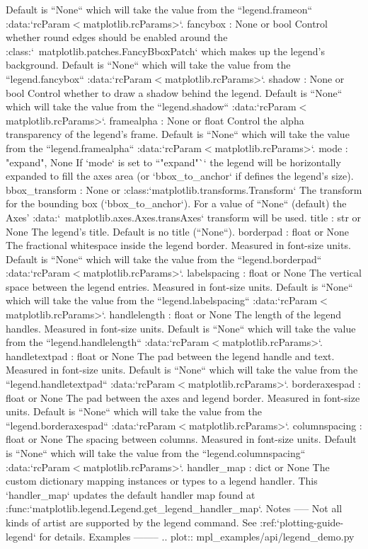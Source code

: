 \begin{description}
Default is ``None`` which will take the value from the ``legend.frameon`` :data:`rcParam$<$matplotlib.rcParams>`. fancybox : None or bool Control whether round edges should be enabled around the :class:`~matplotlib.patches.FancyBboxPatch` which makes up the legend's background. Default is ``None`` which will take the value from the ``legend.fancybox`` :data:`rcParam$<$matplotlib.rcParams>`. shadow : None or bool Control whether to draw a shadow behind the legend. Default is ``None`` which will take the value from the ``legend.shadow`` :data:`rcParam$<$matplotlib.rcParams>`. framealpha : None or float Control the alpha transparency of the legend's frame. Default is ``None`` which will take the value from the ``legend.framealpha`` :data:`rcParam$<$matplotlib.rcParams>`. mode : {"expand", None} If `mode` is set to ``"expand"`` the legend will be horizontally expanded to fill the axes area (or `bbox\_to\_anchor` if defines the legend's size). bbox\_transform : None or :class:`matplotlib.transforms.Transform` The transform for the bounding box (`bbox\_to\_anchor`). For a value of ``None`` (default) the Axes' :data:`~matplotlib.axes.Axes.transAxes` transform will be used. title : str or None The legend's title. Default is no title (``None``). borderpad : float or None The fractional whitespace inside the legend border. Measured in font-size units. Default is ``None`` which will take the value from the ``legend.borderpad`` :data:`rcParam$<$matplotlib.rcParams>`. labelspacing : float or None The vertical space between the legend entries. Measured in font-size units. Default is ``None`` which will take the value from the ``legend.labelspacing`` :data:`rcParam$<$matplotlib.rcParams>`. handlelength : float or None The length of the legend handles. Measured in font-size units. Default is ``None`` which will take the value from the ``legend.handlelength`` :data:`rcParam$<$matplotlib.rcParams>`. handletextpad : float or None The pad between the legend handle and text. Measured in font-size units. Default is ``None`` which will take the value from the ``legend.handletextpad`` :data:`rcParam$<$matplotlib.rcParams>`. borderaxespad : float or None The pad between the axes and legend border. Measured in font-size units. Default is ``None`` which will take the value from the ``legend.borderaxespad`` :data:`rcParam$<$matplotlib.rcParams>`. columnspacing : float or None The spacing between columns. Measured in font-size units. Default is ``None`` which will take the value from the ``legend.columnspacing`` :data:`rcParam$<$matplotlib.rcParams>`. handler\_map : dict or None The custom dictionary mapping instances or types to a legend handler. This `handler\_map` updates the default handler map found at :func:`matplotlib.legend.Legend.get\_legend\_handler\_map`. Notes ----- Not all kinds of artist are supported by the legend command. See :ref:`plotting-guide-legend` for details. Examples -------- .. plot:: mpl\_examples/api/legend\_demo.py

\end{description}
